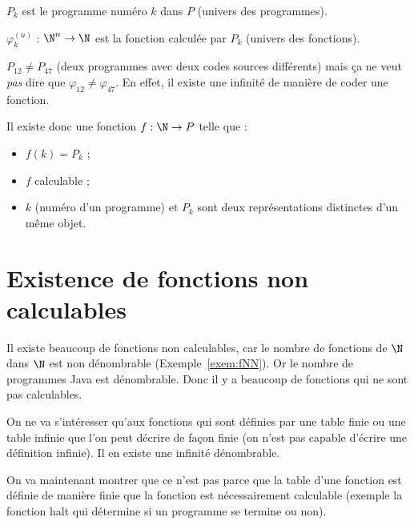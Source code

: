 \begin{mydef}[$P_k$]
	$P_k$ est le programme numéro $k$ dans $P$ (univers des programmes).
\end{mydef}

\begin{mydef}[$\varphi^{(n)}_k$]
	$\varphi^{(n)}_k$ : $\N^n \rightarrow \N$ est la fonction calculée par $P_k$ (univers des fonctions).
\end{mydef}

\begin{myrem}
  $P_{12} \neq P_{47}$ (deux programmes avec deux codes sources différents) mais ça ne veut \emph{pas} dire que $\varphi_{12} \neq \varphi_{47}$. En effet, il existe une infinité de manière de coder une fonction.
\end{myrem}

\begin{myprop}
	Il existe donc une fonction $f : \N\rightarrow P$ telle que :
	\begin{itemize}
		\item $f(k) = P_k$ ;
		\item $f$ calculable ;
		\item $k$ (numéro d'un programme) et $P_k$ sont deux représentations
			distinctes d'un même objet.
	\end{itemize}
\end{myprop}


\section{Existence de fonctions non calculables}
\label{sec:existence_de_fonction_non_calculables}
Il existe beaucoup de fonctions non calculables, car le nombre de fonctions de $\N$ dans $\N$ est non dénombrable (Exemple~\ref{exem:fNN}).
Or le nombre de programmes Java est dénombrable.
Donc il y a beaucoup de fonctions qui ne sont pas calculables.

On ne va s'intéresser qu'aux fonctions qui sont définies par une table finie ou une table infinie que l'on peut décrire de façon finie (on n'est pas capable d'écrire une définition infinie). Il en existe une infinité dénombrable.

On va maintenant montrer que ce n'est pas parce que la table d'une fonction est définie de manière finie que la fonction est nécessairement calculable (exemple la fonction halt qui détermine si un programme se termine ou non).

